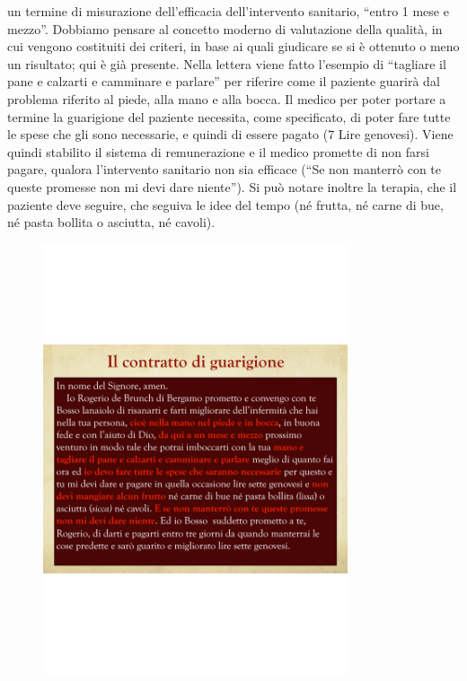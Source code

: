 un termine di misurazione dell'efficacia dell'intervento sanitario,
``entro 1 mese e mezzo''. Dobbiamo pensare al concetto moderno di
valutazione della qualità, in cui vengono costituiti dei criteri, in
base ai quali giudicare se si è ottenuto o meno un risultato; qui è già
presente. Nella lettera viene fatto l'esempio di ``tagliare il pane e
calzarti e camminare e parlare'' per riferire come il paziente guarirà
dal problema riferito al piede, alla mano e alla bocca. Il medico per
poter portare a termine la guarigione del paziente necessita, come
specificato, di poter fare tutte le spese che gli sono necessarie, e
quindi di essere pagato (7 Lire genovesi). Viene quindi stabilito il
sistema di remunerazione e il medico promette di non farsi pagare,
qualora l'intervento sanitario non sia efficace (``Se non manterrò con
te queste promesse non mi devi dare niente''). Si può notare inoltre la
terapia, che il paziente deve seguire, che seguiva le idee del tempo (né
frutta, né carne di bue, né pasta bollita o asciutta, né cavoli).

\begin{figure}[!ht]
\centering
	\includegraphics[width=0.8\textwidth]{38/image1.png}
	\end{figure}

